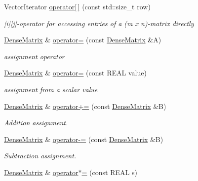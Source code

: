 \begin{DoxyCompactItemize}
\item 
VectorIterator \hyperlink{classhdnum_1_1DenseMatrix_a0b75e9b18cb4ef4eea002473d889bff8}{operator\mbox{[}$\,$\mbox{]}} (const std::size\_\-t row)
\begin{DoxyCompactList}\small\item\em \mbox{[}i\mbox{]}\mbox{[}j\mbox{]}-\/operator for accessing entries of a (m x n)-\/matrix directly \item\end{DoxyCompactList}\item 
\hyperlink{classhdnum_1_1DenseMatrix}{DenseMatrix} \& \hyperlink{classhdnum_1_1DenseMatrix_a45a853bb1f130f7eed4590246b2b5cb5}{operator=} (const \hyperlink{classhdnum_1_1DenseMatrix}{DenseMatrix} \&A)
\begin{DoxyCompactList}\small\item\em assignment operator \item\end{DoxyCompactList}\item 
\hyperlink{classhdnum_1_1DenseMatrix}{DenseMatrix} \& \hyperlink{classhdnum_1_1DenseMatrix_a71db0fae467cdc4951ae4f3c67165b2f}{operator=} (const REAL value)
\begin{DoxyCompactList}\small\item\em assignment from a scalar value \item\end{DoxyCompactList}\item 
\hyperlink{classhdnum_1_1DenseMatrix}{DenseMatrix} \& \hyperlink{classhdnum_1_1DenseMatrix_aebf9d5238390cc39144b8eeb2d76a6f0}{operator+=} (const \hyperlink{classhdnum_1_1DenseMatrix}{DenseMatrix} \&B)
\begin{DoxyCompactList}\small\item\em Addition assignment. \item\end{DoxyCompactList}\item 
\hyperlink{classhdnum_1_1DenseMatrix}{DenseMatrix} \& \hyperlink{classhdnum_1_1DenseMatrix_a4b0031fef6e91b5f319862f16457ac9f}{operator-\/=} (const \hyperlink{classhdnum_1_1DenseMatrix}{DenseMatrix} \&B)
\begin{DoxyCompactList}\small\item\em Subtraction assignment. \item\end{DoxyCompactList}\item 
\hyperlink{classhdnum_1_1DenseMatrix}{DenseMatrix} \& \hyperlink{classhdnum_1_1DenseMatrix_a0681152377c82cc1bffa0384577e3d6b}{operator$\ast$=} (const REAL s)

\end{DoxyCompactItemize}
